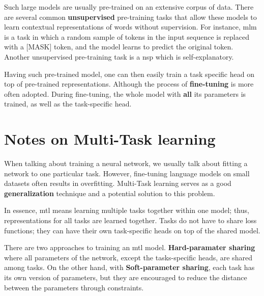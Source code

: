 Such large models are usually pre-trained on an extensive corpus of data. There are several common \textbf{unsupervised} pre-training tasks that allow these models to learn contextual representations of words without supervision. For instance, \gls{mlm} is a task in which a random sample of tokens in the input sequence is replaced with a [MASK] token, and the model learns to predict the original token. Another unsupervised pre-training task is a \gls{nsp} which is self-explanatory.

Having such pre-trained model, one can then easily train a task specific head on top of pre-trained representations. Although the process of \textbf{fine-tuning} is more often adopted. During fine-tuning, the whole model with \textbf{all} its parameters is trained, as well as the task-specific head.

\section{Notes on Multi-Task learning}
When talking about training a neural network, we usually talk about fitting a network to one particular task. However, fine-tuning language models on small datasets often results in overfitting. Multi-Task learning serves as a good \textbf{generalization} technique and a potential solution to this problem.

In essence, \gls{mtl} means learning multiple tasks together within one model; thus, representations for all tasks are learned together. Tasks do not have to share loss functions; they can have their own task-specific heads on top of the shared model.

There are two approaches to training an \gls{mtl} model.
\textbf{Hard-paramater sharing} where all parameters of the network, except the tasks-specific heads, are shared among tasks. On the other hand, with \textbf{Soft-parameter sharing}, each task has its own version of parameters, but they are encouraged to reduce the distance between the parameters through constraints.